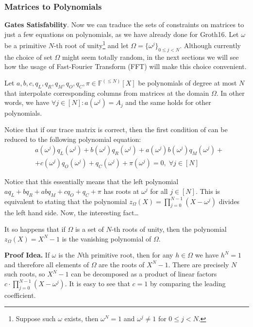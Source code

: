 \documentclass[../lecture-notes.tex]{subfiles}
\begin{document}
\subsubsection{Matrices to Polynomials}

\textcolor{blue!80!black}{\textbf{Gates Satisfability}.} Now we can traduce the
sets of constraints on matrices to just a few equations on polynomials, as we
have already done for Groth16. Let $\omega$ be a primitive $N$-th root of
unity\footnote{Suppose such $\omega$ exists, then $\omega^N = 1$ and $\omega^j
\neq 1$ for $0 \le j < N$.} and let $\Omega = \{\omega^j\}_{0 \le j < N}$.
Although currently the choice of set $\Omega$ might seem totally random, in the
next sections we will see how the usage of Fast-Fourier Transform (FFT) will
make this choice convenient.

Let $a, b, c, q_L, q_R, q_M, q_O, q_C, \pi \in \mathbb{F}^{(\leq N)}[X]$ be
polynomials of degree at most $N$ that interpolate corresponding columns from
matrices at the domain $\Omega$. In other words, we have \(\forall j \in [N]:
a(\omega^j) = A_j\) and the same holds for other polynomials.

Notice that if our trace matrix is correct, then the first condition of
 can be reduced to the following polynomial
equation:
\begin{equation*}
    \begin{aligned}
        &a(\omega^j)q_L(\omega^j) + b(\omega^j)q_R(\omega^j) + a(\omega^j)b(\omega^j)q_M(\omega^j) + \\
        &+ c(\omega^j)q_O(\omega^j) + q_C(\omega^j) + \pi(\omega^j) = 0, \; \forall j \in [N]        
    \end{aligned}
\end{equation*}

Notice that this essentially means that the left polynomial $aq_L + bq_R + abq_M
+ cq_O + q_C + \pi$ has roots at $\omega^j$ for all $j \in [N]$. This is
equivalent to stating that the polynomial $z_{\Omega}(X) =
\prod_{j=0}^{N-1}(X-\omega^j)$ divides the left hand side. Now, the interesting
fact\dots

\begin{lemma}
    It so happens that if $\Omega$ is a set of $N$-th roots of unity, then the
    polynomial $z_{\Omega}(X) = X^N - 1$ is the vanishing polynomial of $\Omega$.
\end{lemma}

\textbf{Proof Idea.} If $\omega$ is the $N$th primitive root, then for any $h
\in \Omega$ we have $h^N = 1$ and therefore all elements of $\Omega$ are the
roots of $X^N-1$. There are precisely $N$ such roots, so $X^N-1$ can be 
decomposed as a product of linear factors $c \cdot \prod_{j=0}^{N-1}(X-\omega^j)$. 
It is easy to see that $c=1$ by comparing the leading coefficient. 
\end{document}
